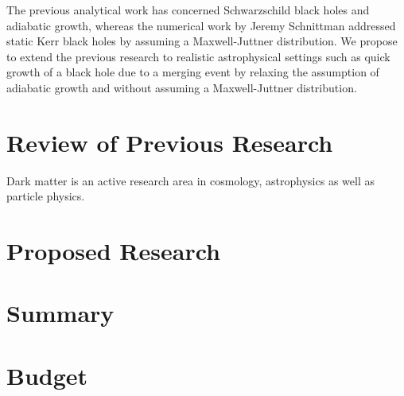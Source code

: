 \documentclass[a4paper,10pt]{article}
\begin{document}
The previous analytical work has concerned Schwarzschild black holes 
and adiabatic growth, whereas the numerical work by Jeremy Schnittman 
addressed static Kerr black holes by assuming a Maxwell-Juttner 
distribution.
We propose to extend the previous research to realistic astrophysical 
settings such as quick growth of a black hole due to a merging event by 
relaxing the assumption of adiabatic growth and without assuming a 
Maxwell-Juttner distribution. 
%

\section{Review of Previous Research}

Dark matter is an active research area in cosmology, astrophysics as well as particle physics.

\section{Proposed Research}

\section{Summary}

\section{Budget}
\end{document}
